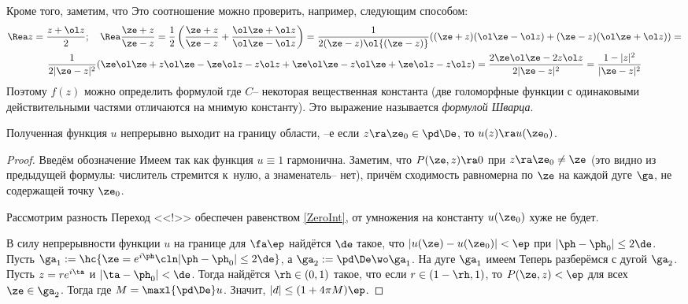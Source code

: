 \documentclass[a4paper]{article}
\begin{document}
Кроме того, заметим, что
Это соотношение можно проверить, например, следующим способом:
\begin{multline*}
  \Rea z = \frac{z + \ol z}{2};\quad
  \Rea \frac{\ze + z}{\ze - z} =
  \frac12 \left(\frac{\ze + z}{\ze - z} + \frac{\ol \ze + \ol z}{\ol \ze - \ol z}\right) =
  \frac{1}{2(\ze - z) \ol{(\ze - z)}}((\ze + z)(\ol \ze - \ol z) + (\ze - z)(\ol \ze + \ol z)) = \\
  \frac{1}{2|\ze - z|^2}(\ze \ol \ze + z \ol \ze - \ze \ol z - z \ol z + \ze \ol \ze - z \ol \ze + \ze \ol z - z \ol z) =
  \frac{2 \ze \ol \ze - 2 z \ol z}{2|\ze - z|^2} = \frac{1 - |z|^2}{|\ze - z|^2}
\end{multline*}
Поэтому $f(z)$ можно определить формулой
где $C$-- некоторая вещественная константа (две голоморфные функции с одинаковыми действительными
частями отличаются на мнимую константу). Это выражение называется \emph{формулой Шварца}.

\begin{theorem}
Полученная функция $u$ непрерывно выходит на границу области, --е если $z\ra \ze_0 \in \pd \De$, то
$u(z)\ra u(\ze_0)$.
\end{theorem}
\begin{proof}
Введём обозначение
Имеем
так как функция $u\equiv 1$ гармонична. Заметим, что
$P(\ze, z) \ra 0$ при $z\ra \ze_0 \neq \ze$ (это видно из предыдущей формулы: числитель стремится
к~нулю, а знаменатель-- нет), причём сходимость равномерна по $\ze$ на каждой дуге $\ga$, не
содержащей точку $\ze_0$.

Рассмотрим разность
Переход <<!>> обеспечен равенством \eqref{ZeroInt}, от умножения на константу $u(\ze_0)$ хуже не будет.

В силу непрерывности функции $u$ на границе для $\fa \ep$ найдётся $\de$ такое,
что $|u(\ze)-u(\ze_0)|<\ep$ при $|\ph-\ph_0|\le 2\de$. Пусть
$\ga_1 := \hc{\ze = e^{i\ph}\cln |\ph-\ph_0|\le 2\de}$, а $\ga_2 := \pd \De \wo \ga_1$.
На дуге $\ga_{1}$ имеем
Теперь разберёмся с дугой $\ga_2$. Пусть $z=re^{i\ta}$ и $|\ta-\ph_0|<\de$. Тогда
найдётся $\rh \in(0,1)$ такое, что если $r \in (1-\rh, 1)$, то $P(\ze,z)<\ep$ для
всех $\ze\in\ga_2$. Тогда
где $M = \maxl{\pd \De}u$. Значит, $|d| \le (1+4\pi M)\ep$.
\end{proof}
\end{document}
